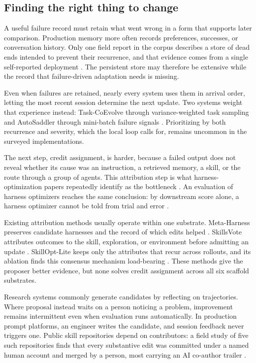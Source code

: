 \documentclass[
  11pt,
]{article}
\newcounter{none} %
\begin{document}
\subsection{Finding the right thing to change}\label{finding-the-right-thing-to-change}

A useful failure record must retain what went wrong in a form that supports later comparison. Production memory more often records preferences, successes, or conversation history. Only one field report in the corpus describes a store of dead ends intended to prevent their recurrence, and that evidence comes from a single self-reported deployment \cite{helwig2026memory}. The persistent store may therefore be extensive while the record that failure-driven adaptation needs is missing.

Even when failures are retained, nearly every system uses them in arrival order, letting the most recent session determine the next update. Two systems weight that experience instead: Task-CoEvolve through variance-weighted task sampling and AutoSaddler through mini-batch failure signals \cite{miyai2026taskcoevolve, park2026autosaddler}. Prioritizing by both recurrence and severity, which the local loop calls for, remains uncommon in the surveyed implementations.

The next step, credit assignment, is harder, because a failed output does not reveal whether its cause was an instruction, a retrieved memory, a skill, or the route through a group of agents. This attribution step is what harness-optimization papers repeatedly identify as the bottleneck \cite{lin2026ahe, zehle2026cantante, lee2026metaharness, nguyen2026harnessevo, liu2026skillsvote}. An evaluation of harness optimizers reaches the same conclusion: by downstream score alone, a harness optimizer cannot be told from trial and error \cite{ong2026harnesseval}.

Existing attribution methods usually operate within one substrate. Meta-Harness preserves candidate harnesses and the record of which edits helped \cite{lee2026metaharness}. SkillsVote attributes outcomes to the skill, exploration, or environment before admitting an update \cite{liu2026skillsvote}. SkillOpt-Lite keeps only the attributes that recur across rollouts, and its ablation finds this consensus mechanism load-bearing \cite{shen2026skilloptlite}. These methods give the proposer better evidence, but none solves credit assignment across all six scaffold substrates.

Research systems commonly generate candidates by reflecting on trajectories. Where proposal instead waits on a person noticing a problem, improvement remains intermittent even when evaluation runs automatically. In production prompt platforms, an engineer writes the candidate, and session feedback never triggers one. Public skill repositories depend on contributors: a field study of five such repositories finds that every substantive edit was committed under a named human account and merged by a person, most carrying an AI co-author trailer \cite{shen2026whomaintains}.
\end{document}
